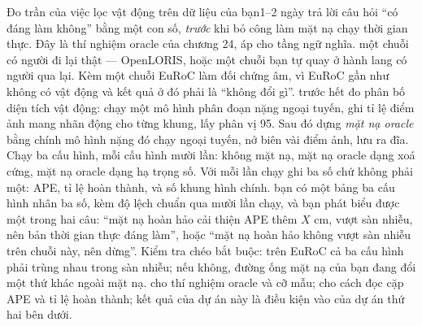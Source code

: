 \documentclass[../../deep_learning.tex]{subfiles}
\begin{document}
\begin{ungdung}
\end{ungdung}

\begin{duan}{Đo trần của việc lọc vật động trên dữ liệu của bạn}{1--2 ngày}
\dmt trả lời câu hỏi ``có đáng làm không'' bằng một con số, \emph{trước} khi bỏ công làm mặt nạ chạy thời gian thực. Đây là thí nghiệm oracle của chương 24, áp cho tầng ngữ nghĩa.
\ddl một chuỗi có người đi lại thật --- OpenLORIS, hoặc một chuỗi bạn tự quay ở hành lang có người qua lại. Kèm một chuỗi EuRoC làm đối chứng âm, vì EuRoC gần như không có vật động và kết quả ở đó phải là ``không đổi gì''.
\dbc trước hết đo phân bố diện tích vật động: chạy một mô hình phân đoạn nặng ngoại tuyến, ghi tỉ lệ điểm ảnh mang nhãn động cho từng khung, lấy phân vị 95. Sau đó dựng \emph{mặt nạ oracle} bằng chính mô hình nặng đó chạy ngoại tuyến, nở biên vài điểm ảnh, lưu ra đĩa. Chạy ba cấu hình, mỗi cấu hình mười lần: không mặt nạ, mặt nạ oracle dạng xoá cứng, mặt nạ oracle dạng hạ trọng số. Với mỗi lần chạy ghi ba số chứ không phải một: APE, tỉ lệ hoàn thành, và số khung hình chính.
\dxk bạn có một bảng ba cấu hình nhân ba số, kèm độ lệch chuẩn qua mười lần chạy, và bạn phát biểu được một trong hai câu: ``mặt nạ hoàn hảo cải thiện APE thêm \(X\) cm, vượt sàn nhiễu, nên bản thời gian thực đáng làm'', hoặc ``mặt nạ hoàn hảo không vượt sàn nhiễu trên chuỗi này, nên dừng''. Kiểm tra chéo bắt buộc: trên EuRoC cả ba cấu hình phải trùng nhau trong sàn nhiễu; nếu không, đường ống mặt nạ của bạn đang đổi một thứ khác ngoài mặt nạ.
\dnv {} cho thí nghiệm oracle và cỡ mẫu;  cho cách đọc cặp APE và tỉ lệ hoàn thành; kết quả của dự án này là điều kiện vào của dự án thứ hai bên dưới.
\end{duan}
\end{document}
